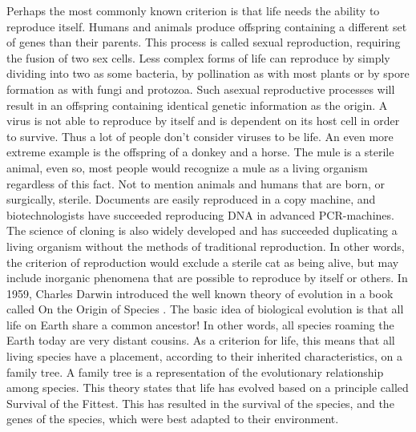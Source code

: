 Perhaps the most commonly known criterion is that life needs the ability to reproduce itself. Humans and animals produce offspring containing a different set of genes than their parents. This process is called sexual reproduction, requiring the fusion of two sex cells. Less complex forms of life can reproduce by simply dividing into two as some bacteria, by pollination as with most plants or by spore formation as with fungi and protozoa. Such asexual reproductive processes will result in an offspring containing identical genetic information as the origin. A virus is not able to reproduce by itself and is dependent on its host cell in order to survive. Thus a lot of people don't consider viruses to be life. An even more extreme example is the offspring of a donkey and a horse. The mule is a sterile animal, even so, most people would recognize a mule as a living organism regardless of this fact. Not to mention animals and humans
that are born, or surgically, sterile. Documents are easily reproduced in a copy machine, and biotechnologists have succeeded reproducing DNA in advanced PCR-machines. The science of cloning is also widely developed and has succeeded duplicating a living organism without the methods of traditional reproduction. In other words, the criterion of reproduction would exclude a sterile cat as being alive, but may include inorganic phenomena that are possible to reproduce by itself or others.
In 1959, Charles Darwin introduced the well known theory of evolution in a book called On the Origin of Species \cite{Darwin}. The basic idea of biological evolution is that all life on Earth share a common ancestor! In other words, all species roaming the Earth today are very distant cousins. As a criterion for life, this means that all living species have a placement, according to their inherited characteristics, on a family tree. A family tree is a representation of the evolutionary relationship among species. This theory states that life has evolved based on a principle called Survival of the Fittest. This has resulted in the survival of the species, and the genes of the species, which were best adapted to their environment. 

